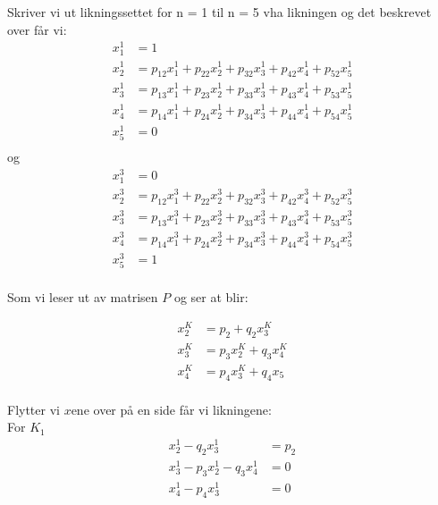 \documentclass[a4paper, norsk, twoside, 10pt]{article}
\begin{document}
\begin{flushleft}
   Skriver vi ut  likningssettet for n = 1 til n = 5 vha likningen og det beskrevet over får vi:
   \begin{align*}
     x_{1}^{1} &= 1 \\
     x_{2}^{1} &= p_{12}x_{1}^{1} + p_{22}x_{2}^{1} + p_{32}x_{3}^{1} + p_{42}x_{4}^{1} + p_{52}x_{5}^{1} \\
     x_{3}^{1} &= p_{13}x_{1}^{1} + p_{23}x_{2}^{1} + p_{33}x_{3}^{1} + p_{43}x_{4}^{1} + p_{53}x_{5}^{1} \\
     x_{4}^{1} &= p_{14}x_{1}^{1} + p_{24}x_{2}^{1} + p_{34}x_{3}^{1} + p_{44}x_{4}^{1} + p_{54}x_{5}^{1}\\
     x_{5}^{1} &= 0 \\
   \end{align*}
   og
   \begin{align*}
     x_{1}^{3} &= 0 \\
     x_{2}^{3} &= p_{12}x_{1}^{3} + p_{22}x_{2}^{3} + p_{32}x_{3}^{3} + p_{42}x_{4}^{3} + p_{52}x_{5}^{3} \\
     x_{3}^{3} &= p_{13}x_{1}^{3} + p_{23}x_{2}^{3} + p_{33}x_{3}^{3} + p_{43}x_{4}^{3} + p_{53}x_{5}^{3} \\
     x_{4}^{3} &= p_{14}x_{1}^{3} + p_{24}x_{2}^{3} + p_{34}x_{3}^{3} + p_{44}x_{4}^{3} + p_{54}x_{5}^{3}\\
     x_{5}^{3} &= 1 \\
   \end{align*}
   
   Som vi leser ut av matrisen $P$ og ser at blir:

   \begin{align*}
     x_{2}^{K} &= p_{2} + q_{2}x_{3}^{K} \\
     x_{3}^{K} &= p_{3}x_{2}^{K} + q_{3}x_{4}^{K}\\
     x_{4}^{K} &= p_{4}x_{3}^{K} + q_{4}x_{5}\\
   \end{align*}   

   Flytter vi $x$ene over på en side får vi likningene:
   \\
   For $K_{1}$
   \begin{align*}
     x_{2}^{1}  - q_{2}x_{3}^{1} &= p_{2}\\
     x_{3}^{1} - p_{3}x_{2}^{1} - q_{3}x_{4}^{1}&= 0\\
     x_{4}^{1} - p_{4}x_{3}^{1} &= 0\\
   \end{align*}   
   \\ \ \\
   

\end{flushleft}
\end{document}
